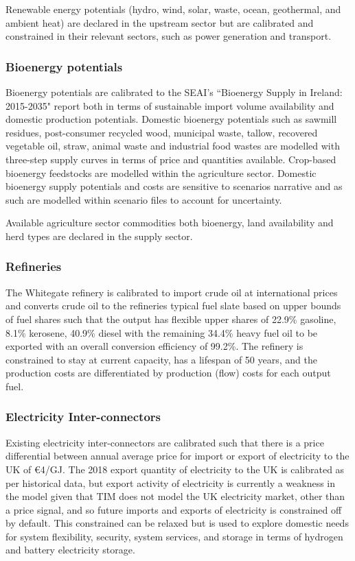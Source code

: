 \documentclass[gmd,manuscript]{copernicus}
\begin{document}
Renewable energy potentials (hydro, wind, solar, waste, ocean, geothermal, and ambient heat) are declared in the upstream sector but are calibrated and constrained in their relevant sectors, such as power generation and transport.

\subsubsection{Bioenergy potentials}
Bioenergy potentials are calibrated to the SEAI's ``Bioenergy Supply in Ireland: 2015-2035" report \citep{SEAI2015} both in terms of sustainable import volume availability and domestic production potentials. Domestic bioenergy potentials such as sawmill residues, post-consumer recycled wood, municipal waste, tallow, recovered vegetable oil, straw, animal waste and industrial food wastes are modelled with three-step supply curves in terms of price and quantities available. Crop-based bioenergy feedstocks are modelled within the agriculture sector. Domestic bioenergy supply potentials and costs are sensitive to scenarios narrative and as such are modelled within scenario files to account for uncertainty.

Available agriculture sector commodities both bioenergy, land availability and herd types are declared in the supply sector.

\subsubsection{Refineries}
The Whitegate refinery is calibrated to import crude oil at international prices and converts crude oil to the refineries typical fuel slate based on upper bounds of fuel shares such that the output has flexible upper shares of 22.9\% gasoline, 8.1\% kerosene, 40.9\% diesel with the remaining 34.4\% heavy fuel oil to be exported with an overall conversion efficiency of 99.2\%. The refinery is constrained to stay at current capacity, has a lifespan of 50 years, and the production costs are differentiated by production (flow) costs for each output fuel.

\subsubsection{Electricity Inter-connectors}
Existing electricity inter-connectors are calibrated such that there is a price differential between annual average price for import or export of electricity to the UK of \euro{4}/GJ. The 2018 export quantity of electricity to the UK is calibrated as per historical data, but export activity of electricity is currently a weakness in the model given that TIM does not model the UK electricity market, other than a price signal, and so future imports and exports of electricity is constrained off by default. This constrained can be relaxed but is used to explore domestic needs for system flexibility, security, system services, and storage in terms of hydrogen and battery electricity storage.
\end{document}
